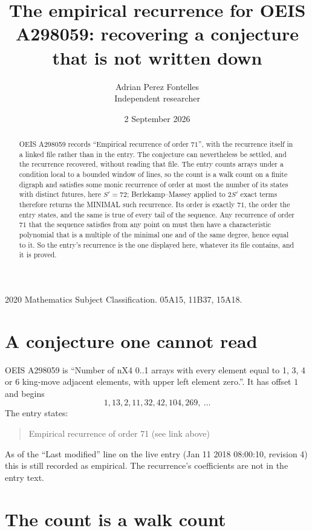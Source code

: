 \documentclass[11pt,a4paper]{article}
\title{The empirical recurrence for OEIS A298059: recovering a conjecture that is not written down}
\author{Adrian Perez Fontelles\\ \small Independent researcher}
\date{2 September 2026}
\theoremstyle{plain}
\theoremstyle{definition}
\begin{document}
\maketitle

\begin{abstract}
OEIS A298059 records ``Empirical recurrence of order $71$'', with the recurrence itself in a
linked file rather than in the entry. The conjecture can nevertheless be settled, and the
recurrence recovered, without reading that file. The entry counts arrays under a condition
local to a bounded window of lines, so the count is a walk count on a finite digraph and
satisfies some monic recurrence of order at most the number of its states with distinct
futures, here $S'=72$; Berlekamp--Massey applied to $2S'$ exact
terms therefore returns the MINIMAL such recurrence. Its order is exactly $71$, the order
the entry states, and the same is true of every tail of the sequence. Any recurrence of order
$71$ that the sequence satisfies from any point on must then have a characteristic
polynomial that is a multiple of the minimal one and of the same degree, hence equal to it. So
the entry's recurrence is the one displayed here, whatever its file contains, and it is
proved.
\end{abstract}

\noindent\small 2020 Mathematics Subject Classification. 05A15, 11B37, 15A18.\normalsize

\section{A conjecture one cannot read}

OEIS A298059 is ``Number of nX4 0..1 arrays with every element equal to 1, 3, 4 or 6 king-move adjacent elements, with upper left element zero.''. It has offset $1$ and begins
\[
1, 13, 2, 11, 32, 42, 104, 269,\ \dots
\]
The entry states:
\begin{quote}
Empirical recurrence of order 71 (see link above)
\end{quote}
As of the ``Last modified'' line on the live entry (Jan 11 2018 08:00:10, revision 4) this is still
recorded as empirical. The recurrence's coefficients are not in the entry text.

\section{The count is a walk count}
\end{document}
